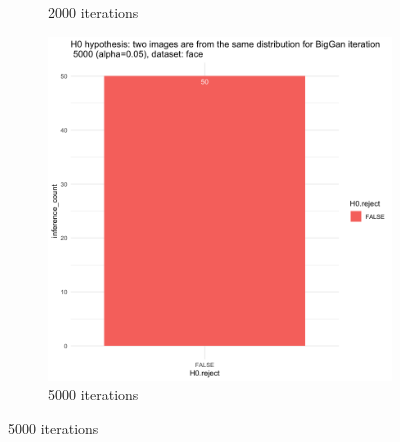 \documentclass{article}
\begin{document}
\begin{figure}[h!]
\begin{subfigure}[b]{0.3\textwidth}
         \caption{2000 iterations}
     \end{subfigure}
     \hfill
     \begin{subfigure}[b]{0.3\textwidth}
         \centering
         \includegraphics[width=\textwidth]{kmmd_figures/biggan_face_5000.png}
         \caption{5000 iterations}
     \end{subfigure}
\end{figure}
\end{document}
